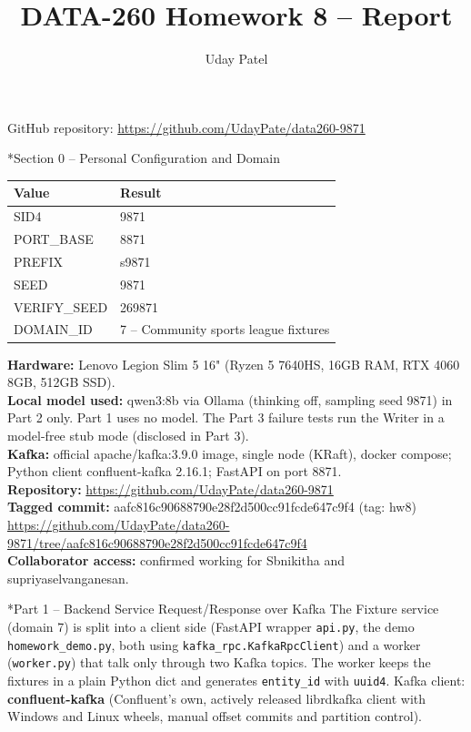 \documentclass[11pt]{article}
\title{DATA-260 Homework 8 -- Report}
\author{Uday Patel}
\date{}
\makeatletter
\renewcommand\section{\@startsection{section}{1}{\z@}{-3.0ex \@plus -1ex \@minus -.2ex}{1.2ex \@plus.2ex}{\normalfont\fontsize{14}{17}\selectfont\bfseries}}
\makeatother
\begin{document}
\maketitle
\begin{center}GitHub repository: \url{https://github.com/UdayPate/data260-9871}\end{center}

\section*{Section 0 -- Personal Configuration and Domain}
\begin{tabular}{|l|l|}\hline
\textbf{Value} & \textbf{Result} \\\hline
SID4 & 9871 \\\hline
PORT\_BASE & 8871 \\\hline
PREFIX & s9871 \\\hline
SEED & 9871 \\\hline
VERIFY\_SEED & 269871 \\\hline
DOMAIN\_ID & 7 -- Community sports league fixtures \\\hline
\end{tabular}
\vspace{1em}

\textbf{Hardware:} Lenovo Legion Slim 5 16" (Ryzen 5 7640HS, 16GB RAM, RTX 4060 8GB, 512GB SSD). \\
\textbf{Local model used:} qwen3:8b via Ollama (thinking off, sampling seed 9871) in Part 2 only. Part 1 uses no model. The Part 3 failure tests run the Writer in a model-free stub mode (disclosed in Part 3). \\
\textbf{Kafka:} official apache/kafka:3.9.0 image, single node (KRaft), docker compose; Python client confluent-kafka 2.16.1; FastAPI on port 8871. \\
\textbf{Repository:} \url{https://github.com/UdayPate/data260-9871} \\
\textbf{Tagged commit:} aafc816c90688790e28f2d500cc91fcde647c9f4 (tag: hw8) \\
{\footnotesize\url{https://github.com/UdayPate/data260-9871/tree/aafc816c90688790e28f2d500cc91fcde647c9f4}} \\
\textbf{Collaborator access:} confirmed working for Sbnikitha and supriyaselvanganesan.

\section*{Part 1 -- Backend Service Request/Response over Kafka}
The Fixture service (domain 7) is split into a client side (FastAPI wrapper \texttt{api.py}, the demo \texttt{homework\_\allowbreak{}demo.py}, both using \texttt{kafka\_\allowbreak{}rpc.KafkaRpcClient}) and a worker (\texttt{worker.py}) that talk only through two Kafka topics. The worker keeps the fixtures in a plain Python dict and generates \texttt{entity\_\allowbreak{}id} with \texttt{uuid4}. Kafka client: \textbf{confluent-kafka} (Confluent's own, actively released librdkafka client with Windows and Linux wheels, manual offset commits and partition control).
\end{document}
